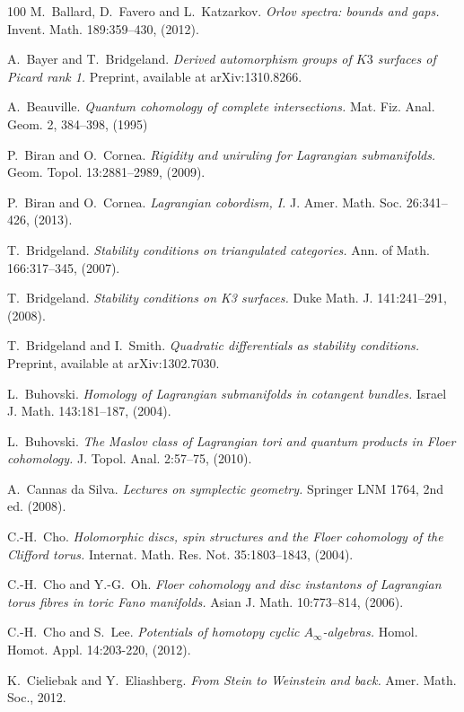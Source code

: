 \documentclass[11pt,a4paper]{article}
\numberwithin{equation}{section}
\begin{document}
\begin{thebibliography}{100}
M.~Ballard, D.~Favero and L.~Katzarkov.
\emph{Orlov spectra: bounds and gaps.}
Invent. Math. 189:359--430, (2012).

A.~Bayer and T.~Bridgeland.
\emph{Derived automorphism groups of $K3$ surfaces of Picard rank 1.}
Preprint, available at arXiv:1310.8266.

A.~Beauville.
\emph{Quantum cohomology of complete intersections.}
Mat. Fiz. Anal. Geom. 2, 384--398, (1995)

P.~Biran and O.~Cornea.
\emph{Rigidity and uniruling for Lagrangian submanifolds.}
Geom. Topol. 13:2881--2989, (2009).

P.~Biran and O.~Cornea.
\emph{Lagrangian cobordism, I.}
J. Amer. Math. Soc. 26:341--426, (2013).

T.~Bridgeland.
\emph{Stability conditions on triangulated categories.}
Ann. of Math. 166:317--345, (2007).

T.~Bridgeland.
\emph{Stability conditions on K3 surfaces.}
Duke Math. J. 141:241--291, (2008).

T.~Bridgeland and I.~Smith.
\emph{Quadratic differentials as stability conditions.}
Preprint, available at arXiv:1302.7030.

L.~Buhovski.
\emph{Homology of Lagrangian submanifolds in cotangent bundles.}
Israel J. Math. 143:181--187,  (2004).

L.~Buhovski.
\emph{The Maslov class of Lagrangian tori and quantum products in Floer cohomology.}
J. Topol. Anal. 2:57--75, (2010).

A.~Cannas da Silva.
\emph{Lectures on symplectic geometry.}
Springer LNM 1764, 2nd ed. (2008).

C.-H.~Cho.
\emph{Holomorphic discs, spin structures and the Floer cohomology of the Clifford torus.}
Internat. Math. Res. Not. 35:1803--1843, (2004).

C.-H.~Cho and Y.-G.~Oh.
\emph{Floer cohomology and disc instantons of Lagrangian torus fibres in toric Fano manifolds.}
Asian J. Math. 10:773--814, (2006).

C.-H.~Cho and S.~Lee.
\emph{Potentials of homotopy cyclic $A_{\infty}$-algebras.}
Homol. Homot. Appl. 14:203-220, (2012).

K.~Cieliebak and Y.~Eliashberg.
\emph{From Stein to Weinstein and back.}
Amer. Math. Soc., 2012.


\end{thebibliography}
\end{document}
